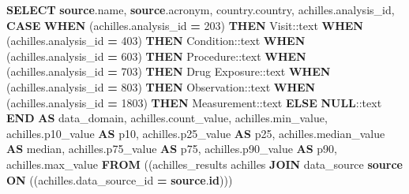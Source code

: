 \documentclass[
]{book}
\newenvironment{Shaded}{\begin{snugshade}}{\end{snugshade}}
\newcommand{\CharTok}[1]{\textcolor[rgb]{0.31,0.60,0.02}{#1}}
\newcommand{\ControlFlowTok}[1]{\textcolor[rgb]{0.13,0.29,0.53}{\textbf{#1}}}
\newcommand{\DecValTok}[1]{\textcolor[rgb]{0.00,0.00,0.81}{#1}}
\newcommand{\FunctionTok}[1]{\textcolor[rgb]{0.00,0.00,0.00}{#1}}
\newcommand{\KeywordTok}[1]{\textcolor[rgb]{0.13,0.29,0.53}{\textbf{#1}}}
\newcommand{\NormalTok}[1]{#1}
\newcommand{\OperatorTok}[1]{\textcolor[rgb]{0.81,0.36,0.00}{\textbf{#1}}}
\newcommand{\StringTok}[1]{\textcolor[rgb]{0.31,0.60,0.02}{#1}}
\begin{document}
\begin{Shaded}
\begin{Highlighting}[]
\KeywordTok{SELECT} \KeywordTok{source}\NormalTok{.name,}
   \KeywordTok{source}\NormalTok{.acronym,}
\NormalTok{   country.country,}
\NormalTok{   achilles.analysis\_id,}
       \ControlFlowTok{CASE}
           \ControlFlowTok{WHEN}\NormalTok{ (achilles.analysis\_id }\OperatorTok{=} \DecValTok{203}\NormalTok{)}
             \ControlFlowTok{THEN} \StringTok{\textquotesingle{}Visit\textquotesingle{}}\NormalTok{:}\CharTok{:text}
           \ControlFlowTok{WHEN}\NormalTok{ (achilles.analysis\_id }\OperatorTok{=} \DecValTok{403}\NormalTok{)}
             \ControlFlowTok{THEN} \StringTok{\textquotesingle{}Condition\textquotesingle{}}\NormalTok{:}\CharTok{:text}
           \ControlFlowTok{WHEN}\NormalTok{ (achilles.analysis\_id }\OperatorTok{=} \DecValTok{603}\NormalTok{)}
             \ControlFlowTok{THEN} \StringTok{\textquotesingle{}Procedure\textquotesingle{}}\NormalTok{:}\CharTok{:text}
           \ControlFlowTok{WHEN}\NormalTok{ (achilles.analysis\_id }\OperatorTok{=} \DecValTok{703}\NormalTok{)}
             \ControlFlowTok{THEN} \StringTok{\textquotesingle{}Drug Exposure\textquotesingle{}}\NormalTok{:}\CharTok{:text}
           \ControlFlowTok{WHEN}\NormalTok{ (achilles.analysis\_id }\OperatorTok{=} \DecValTok{803}\NormalTok{)}
             \ControlFlowTok{THEN} \StringTok{\textquotesingle{}Observation\textquotesingle{}}\NormalTok{:}\CharTok{:text}
           \ControlFlowTok{WHEN}\NormalTok{ (achilles.analysis\_id }\OperatorTok{=} \DecValTok{1803}\NormalTok{)}
             \ControlFlowTok{THEN} \StringTok{\textquotesingle{}Measurement\textquotesingle{}}\NormalTok{:}\CharTok{:text}
           \ControlFlowTok{ELSE} \KeywordTok{NULL}\NormalTok{:}\CharTok{:text}
       \ControlFlowTok{END} \KeywordTok{AS}\NormalTok{ data\_domain,}
\NormalTok{   achilles.count\_value,}
\NormalTok{   achilles.min\_value,}
\NormalTok{   achilles.p10\_value }\KeywordTok{AS}\NormalTok{ p10,}
\NormalTok{   achilles.p25\_value }\KeywordTok{AS}\NormalTok{ p25,}
\NormalTok{   achilles.median\_value }\KeywordTok{AS} \FunctionTok{median}\NormalTok{,}
\NormalTok{   achilles.p75\_value }\KeywordTok{AS}\NormalTok{ p75,}
\NormalTok{   achilles.p90\_value }\KeywordTok{AS}\NormalTok{ p90,}
\NormalTok{   achilles.max\_value}
  \KeywordTok{FROM}\NormalTok{ ((achilles\_results achilles}
    \KeywordTok{JOIN}\NormalTok{ data\_source }\KeywordTok{source}
      \KeywordTok{ON}\NormalTok{ ((achilles.data\_source\_id }\OperatorTok{=} \KeywordTok{source}\NormalTok{.}\KeywordTok{id}\NormalTok{)))}

\end{Highlighting}
\end{Shaded}
\end{document}
